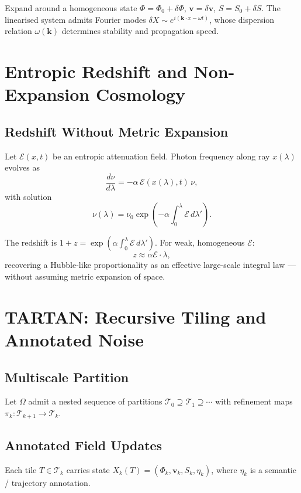 \documentclass[11pt, openany]{book}
\theoremstyle{plain}
\theoremstyle{definition}
\theoremstyle{remark}
\begin{document}
Expand around a homogeneous state
$\Phi=\Phi_0+\delta\Phi$, $\mathbf{v}=\delta\mathbf{v}$, $S=S_0+\delta S$.
The linearised system admits Fourier modes
$\delta X\sim e^{i(\mathbf{k}\cdot x-\omega t)}$,
whose dispersion relation $\omega(\mathbf{k})$ determines stability and
propagation speed.

\chapter{Entropic Redshift and Non-Expansion Cosmology}

\section{Redshift Without Metric Expansion}

Let $\mathcal{E}(x,t)$ be an entropic attenuation field. Photon frequency
along ray $x(\lambda)$ evolves as
\[
  \frac{d\nu}{d\lambda}=-\alpha\,\mathcal{E}(x(\lambda),t)\,\nu,
\]
with solution
\[
  \nu(\lambda)=\nu_0\exp\!\left(-\alpha\int_0^\lambda\mathcal{E}\,d\lambda'\right).
\]

The redshift is
$1+z = \exp\!\left(\alpha\int_0^\lambda\mathcal{E}\,d\lambda'\right)$.
For weak, homogeneous $\mathcal{E}$:
\[
  z\approx\alpha\mathcal{E}\cdot\lambda,
\]
recovering a Hubble-like proportionality as an effective large-scale integral
law --- without assuming metric expansion of space.

\chapter{TARTAN: Recursive Tiling and Annotated Noise}

\section{Multiscale Partition}

Let $\Omega$ admit a nested sequence of partitions
$\mathcal{T}_0\supseteq\mathcal{T}_1\supseteq\cdots$ with refinement maps
$\pi_k:\mathcal{T}_{k+1}\to\mathcal{T}_k$.

\section{Annotated Field Updates}

Each tile $T\in\mathcal{T}_k$ carries state
$X_k(T)=(\Phi_k,\mathbf{v}_k,S_k,\eta_k)$,
where $\eta_k$ is a semantic / trajectory annotation.
\end{document}
